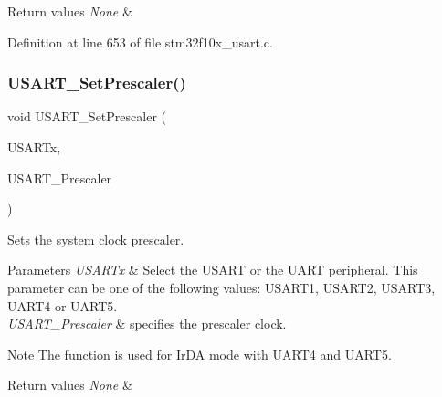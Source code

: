 \begin{DoxyRetVals}{Return values}
{\em None} & \\
\hline
\end{DoxyRetVals}


Definition at line 653 of file stm32f10x\+\_\+usart.\+c.

\mbox{\label{group___u_s_a_r_t___private___functions_gaf5da8f2eee8245425584d85d4f62cc33}} 
\subsubsection{\texorpdfstring{U\+S\+A\+R\+T\+\_\+\+Set\+Prescaler()}{USART\_SetPrescaler()}}
{\footnotesize\ttfamily void U\+S\+A\+R\+T\+\_\+\+Set\+Prescaler (\begin{DoxyParamCaption}\item[{\hyperlink{struct_u_s_a_r_t___type_def}{U\+S\+A\+R\+T\+\_\+\+Type\+Def} $\ast$}]{U\+S\+A\+R\+Tx,  }\item[{uint8\+\_\+t}]{U\+S\+A\+R\+T\+\_\+\+Prescaler }\end{DoxyParamCaption})}



Sets the system clock prescaler. 


\begin{DoxyParams}{Parameters}
{\em U\+S\+A\+R\+Tx} & Select the U\+S\+A\+RT or the U\+A\+RT peripheral. This parameter can be one of the following values\+: U\+S\+A\+R\+T1, U\+S\+A\+R\+T2, U\+S\+A\+R\+T3, U\+A\+R\+T4 or U\+A\+R\+T5. \\
\hline
{\em U\+S\+A\+R\+T\+\_\+\+Prescaler} & specifies the prescaler clock. \\
\hline
\end{DoxyParams}
\begin{DoxyNote}{Note}
The function is used for Ir\+DA mode with U\+A\+R\+T4 and U\+A\+R\+T5. 
\end{DoxyNote}

\begin{DoxyRetVals}{Return values}
{\em None} & \\
\hline
\end{DoxyRetVals}


